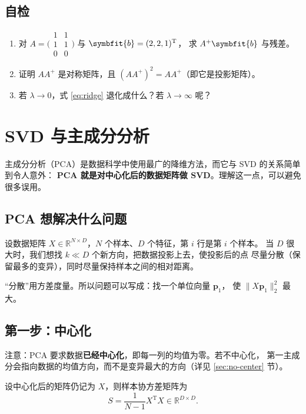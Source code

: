 \documentclass[UTF8, 11pt, a4paper, fontset=windows]{ctexart}
\theoremstyle{cnthm}
\theoremstyle{cndef}
\newcommand{\T}{^{\mathrm{T}}}
\newcommand{\R}{\mathbb{R}}
\newcommand{\nrm}[1]{\lVert #1 \rVert}
\newcommand{\bb}{\symbfit{b}}
\begin{document}
\subsection*{自检}
\begin{enumerate}
  \item 对 $A=\bigl(\begin{smallmatrix}1&1\\1&1\\0&0\end{smallmatrix}\bigr)$ 与 $\bb=(2,2,1)\T$，
        求 $A^{+}\bb$ 与残差。
  \item 证明 $AA^{+}$ 是对称矩阵，且 $(AA^{+})^2=AA^{+}$（即它是投影矩阵）。
  \item 若 $\lambda\to0$，式 \eqref{eq:ridge} 退化成什么？若 $\lambda\to\infty$ 呢？
\end{enumerate}

\section{SVD 与主成分分析}\label{sec:pca}

主成分分析（PCA）是数据科学中使用最广的降维方法，而它与 SVD 的关系简单到令人意外：
\textbf{PCA 就是对中心化后的数据矩阵做 SVD}。理解这一点，可以避免很多误用。

\subsection{PCA 想解决什么问题}

设数据矩阵 $X\in\R^{N\times D}$，$N$ 个样本、$D$ 个特征，第 $i$ 行是第 $i$ 个样本。
当 $D$ 很大时，我们想找 $k\ll D$ 个新方向，把数据投影上去，使投影后的点
尽量分散（保留最多的变异），同时尽量保持样本之间的相对距离。

“分散”用方差度量。所以问题可以写成：找一个单位向量 $\mathbf{p}_1$，
使 $\nrm{X\mathbf{p}_1}_2^2$ 最大。

\subsection{第一步：中心化}

注意：PCA 要求数据\textbf{已经中心化}，即每一列的均值为零。若不中心化，
第一主成分会指向数据的均值方向，而不是变异最大的方向（详见 \ref{sec:no-center} 节）。

设中心化后的矩阵仍记为 $X$，则样本协方差矩阵为
\begin{equation}
  S=\frac{1}{N-1}X\T X\in\R^{D\times D} .
\end{equation}
\end{document}
